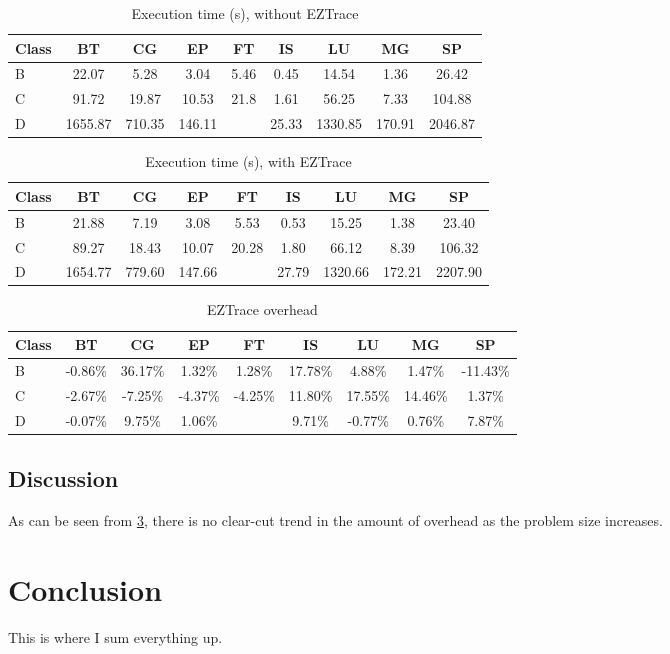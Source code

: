 \documentclass[12pt]{article}
\begin{document}
\begin{table}[H]
\centering
\caption{Execution time (s), without EZTrace}
\label{tab:notrace}
\begin{tabular}{|l|cccccccc|}
\hline
Class & BT      & CG     & EP     & FT   & IS    & LU      & MG     & SP      \\ \hline
B     & 22.07   & 5.28   & 3.04   & 5.46 & 0.45  & 14.54   & 1.36   & 26.42   \\
C     & 91.72   & 19.87  & 10.53  & 21.8 & 1.61  & 56.25   & 7.33   & 104.88  \\
D     & 1655.87 & 710.35 & 146.11 &      & 25.33 & 1330.85 & 170.91 & 2046.87 \\
\hline
\end{tabular}
\end{table}

\begin{table}[H]
\centering
\caption{Execution time (s), with EZTrace}
\label{tab:eztrace}
\begin{tabular}{|l|cccccccc|}
\hline
Class & BT      & CG     & EP     & FT    & IS    & LU      & MG     & SP      \\ \hline
B     & 21.88   & 7.19   & 3.08   & 5.53  & 0.53  & 15.25   & 1.38   & 23.40   \\
C     & 89.27   & 18.43  & 10.07  & 20.28 & 1.80  & 66.12   & 8.39   & 106.32  \\
D     & 1654.77 & 779.60 & 147.66 &       & 27.79 & 1320.66 & 172.21 & 2207.90 \\
\hline
\end{tabular}
\end{table}

\begin{table}[H]
\centering
\caption{EZTrace overhead}
\label{tab:overhead}
\begin{tabular}{|l|cccccccc}
\hline
Class & BT      & CG      & EP      & FT      & IS      & LU      & MG      & SP       \\ \hline
B     & -0.86\% & 36.17\% & 1.32\%  & 1.28\%  & 17.78\% & 4.88\%  & 1.47\%  & -11.43\% \\
C     & -2.67\% & -7.25\% & -4.37\% & -4.25\% & 11.80\% & 17.55\% & 14.46\% & 1.37\%   \\
D     & -0.07\% & 9.75\%  & 1.06\%  &         & 9.71\%  & -0.77\% & 0.76\%  & 7.87\%   \\
\hline
\end{tabular}
\end{table}

\subsection{Discussion}

As can be seen from \ref{tab:overhead}, there is no clear-cut trend in the amount of overhead as the problem size increases.

\section{Conclusion}

This is where I sum everything up.



\end{document}
